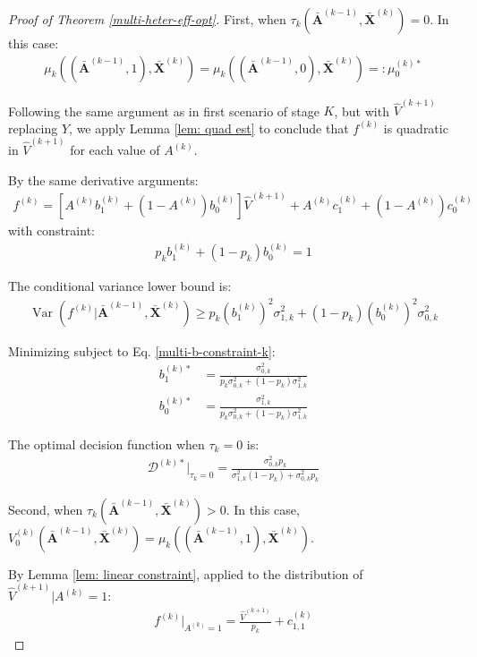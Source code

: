 \documentclass[11pt]{article}
\theoremstyle{referenceplain}
\theoremstyle{referencedefinition}
\theoremstyle{referenceremark}
\begin{document}
\begin{proof}[Proof of Theorem \ref{multi-heter-eff-opt}]
First, when $\tau_k(\bar{\mathbf{A}}^{(k-1)}, \bar{\mathbf{X}}^{(k)}) = 0$. In this case:
\begin{align*}
    \mu_k((\bar{\mathbf{A}}^{(k-1)}, 1), \bar{\mathbf{X}}^{(k)}) = \mu_k((\bar{\mathbf{A}}^{(k-1)}, 0), \bar{\mathbf{X}}^{(k)}) =: \mu_0^{(k)*}
\end{align*}

Following the same argument as in first scenario of stage $K$, but with $\widehat{V}^{(k+1)}$ replacing $Y$, we apply Lemma \ref{lem: quad est} to conclude that $f^{(k)}$ is quadratic in $\widehat{V}^{(k+1)}$ for each value of $A^{(k)}$.

By the same derivative arguments:
\begin{align}
    f^{(k)} = [A^{(k)} b_{1}^{(k)} + (1-A^{(k)}) b_{0}^{(k)}] \widehat{V}^{(k+1)} + A^{(k)} c_{1}^{(k)} + (1-A^{(k)}) c_{0}^{(k)}
\end{align}
with constraint:
\begin{align}\label{multi-b-constraint-k}
    p_k b_{1}^{(k)} + (1-p_k) b_{0}^{(k)} = 1
\end{align}

The conditional variance lower bound is:
\begin{align}
    \operatorname{Var}(f^{(k)} | \bar{\mathbf{A}}^{(k-1)}, \bar{\mathbf{X}}^{(k)}) \geq p_k (b_{1}^{(k)})^2 \sigma_{1,k}^2 + (1-p_k) (b_{0}^{(k)})^2 \sigma_{0,k}^2
\end{align}

Minimizing subject to Eq. \eqref{multi-b-constraint-k}:
\begin{align}
    b_{1}^{(k)*} &= \frac{\sigma_{0,k}^2}{p_k \sigma_{0,k}^2 + (1-p_k) \sigma_{1,k}^2} \\
    b_{0}^{(k)*} &= \frac{\sigma_{1,k}^2}{p_k \sigma_{0,k}^2 + (1-p_k) \sigma_{1,k}^2}
\end{align}

The optimal decision function when $\tau_k = 0$ is:
\begin{align}\label{multi-D-k-tau0-opt}
    \mathcal{D}^{(k)*}|_{\tau_k = 0} = \frac{\sigma_{0,k}^2 p_k}{\sigma_{1,k}^2 (1-p_k) + \sigma_{0,k}^2 p_k}
\end{align}

Second, when $\tau_k(\bar{\mathbf{A}}^{(k-1)}, \bar{\mathbf{X}}^{(k)}) > 0$. In this case, $V_0^{(k)}(\bar{\mathbf{A}}^{(k-1)}, \bar{\mathbf{X}}^{(k)}) = \mu_k((\bar{\mathbf{A}}^{(k-1)}, 1), \bar{\mathbf{X}}^{(k)})$.

By Lemma \ref{lem: linear constraint}, applied to the distribution of $\widehat{V}^{(k+1)} | A^{(k)} = 1$:
\begin{align}
    f^{(k)}|_{A^{(k)}=1} = \frac{\widehat{V}^{(k+1)}}{p_k} + c_{1,1}^{(k)}
\end{align}


\end{proof}
\end{document}
